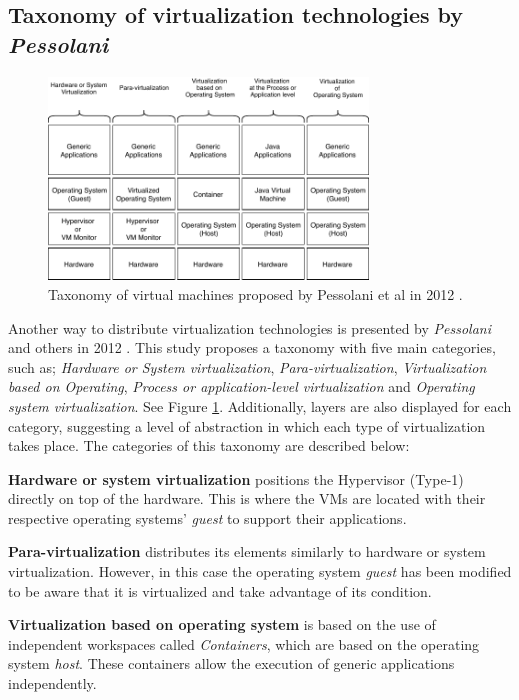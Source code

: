 	\subsection{Taxonomy of virtualization technologies by \textit{Pessolani}}
	
	\begin{figure}[H]
		\centering
		\includegraphics[width=8.5cm]{images/Pessolani2012.pdf}
		\vspace{-0.2cm}
		\caption{Taxonomy of virtual machines proposed by Pessolani et al in 2012 \cite{Pessolani2012}.}
		\label{fig:TaxonomiaDeTecnologiasDeVirtualizacion}
	\end{figure}
	
	Another way to distribute virtualization technologies is presented by \textit{Pessolani} and others in 2012 \cite{Pessolani2012}.  This study proposes a taxonomy with five main categories, such as; \textit{Hardware or System virtualization}, \textit{Para-virtualization}, \textit{Virtualization based on Operating}, \textit{Process or application-level virtualization} and \textit{Operating system virtualization}. See Figure \ref{fig:TaxonomiaDeTecnologiasDeVirtualizacion}. Additionally, layers are also displayed for each category, suggesting a level of abstraction in which each type of virtualization takes place. The categories of this taxonomy are described below:
	
		\textbf{Hardware or system virtualization} positions the Hypervisor (Type-1) directly on top of the hardware. This is where the VMs are located with their respective operating systems' \textit{guest} to support their applications.
		
		\textbf{Para-virtualization} distributes its elements similarly to hardware or system virtualization. However, in this case the operating system \textit{guest} has been modified to be aware that it is virtualized and take advantage of its condition.
		
		\textbf{Virtualization based on operating system} is based on the use of independent workspaces called \textit{Containers}, which are based on the operating system \textit{host}. These containers allow the execution of generic applications independently.
		
